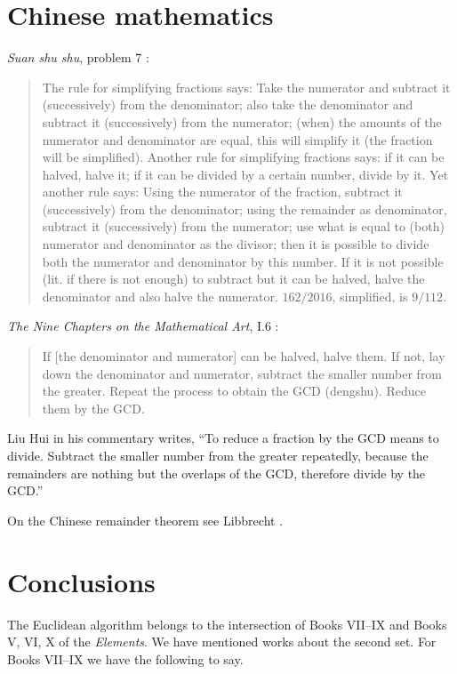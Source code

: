 \documentclass{article}
\begin{document}
\section{Chinese mathematics}
{\em Suan shu shu}, problem 7 \cite[pp.~111--112]{suanshushu}:

\begin{quote}
The rule for simplifying fractions says: Take the numerator and subtract it (successively) from the denominator; also take the denominator and subtract it (successively) from the numerator; (when) the amounts of the numerator and denominator are equal, this will simplify it (the fraction will be simplified). Another rule for simplifying fractions says: if it can be halved, halve it; if it can be divided by a certain number, divide by it. Yet another rule says: Using the numerator of the fraction, subtract it (successively) from the denominator; using the remainder as denominator, subtract it (successively) from the numerator; use what is equal to (both) numerator and denominator as the divisor; then it is possible to divide both the numerator and denominator by this number. If it is not possible (lit. if there is not enough) to subtract but it can be halved, halve the denominator and also halve the numerator.
$162/2016$, simplified, is $9/112$.
\end{quote}


{\em The Nine Chapters on the Mathematical Art}, I.6 \cite[p.~64]{ninechapters}: 

\begin{quote}
If [the denominator and numerator] can be halved, halve them. If not, lay down the denominator
and numerator, subtract the smaller number from the greater. Repeat the process to obtain the GCD (dengshu).
Reduce them by the GCD.
\end{quote}

Liu Hui in his commentary writes, ``To reduce a fraction by the GCD means to divide. Subtract the smaller
number from the greater repeatedly, because the remainders are nothing but the overlaps
of the GCD, therefore divide by the GCD.''

On the Chinese remainder theorem see Libbrecht \cite{libbrecht}.







\section{Conclusions}
The Euclidean algorithm belongs to the intersection of Books VII--IX and Books V, VI, X of the {\em Elements}.
We have mentioned works about the second set.
For Books VII--IX we have the following to say.
\end{document}
